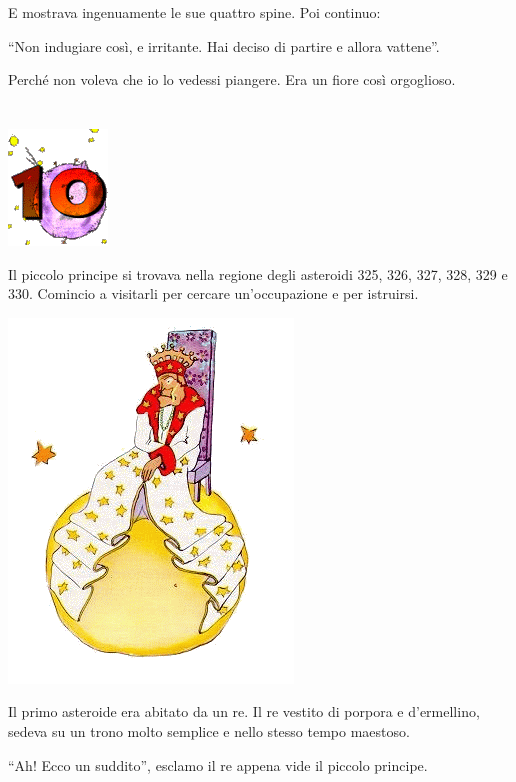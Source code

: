 \documentclass[11pt]{scrbook}
\begin{document}
E mostrava ingenuamente le sue quattro spine. Poi continuo:

``Non indugiare così, e irritante. Hai deciso di partire e allora
vattene''.

Perché non voleva che io lo vedessi piangere. Era un fiore così
orgoglioso.

\chapter{}
\begin{center}
\includegraphics{img/chapter10}
\end{center}

Il piccolo principe si trovava nella regione degli asteroidi 325, 326,
327, 328, 329 e 330. Comincio a visitarli per cercare un'occupazione e
per istruirsi.

\begin{center}
\includegraphics{img/10a}
\end{center}

Il primo asteroide era abitato da un re. Il re vestito di porpora e
d'ermellino, sedeva su un trono molto semplice e nello stesso tempo
maestoso.

``Ah! Ecco un suddito'', esclamo il re appena vide il piccolo principe.
\end{document}
